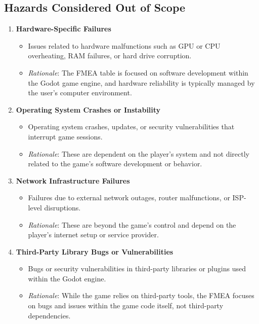\documentclass{article}
\begin{document}
\subsection{Hazards Considered Out of Scope}
\begin{enumerate}
    \item \textbf{Hardware-Specific Failures}
        \begin{itemize}
            \item Issues related to hardware malfunctions such as GPU or CPU overheating, RAM failures, or hard drive corruption.
            \item \textit{Rationale}: The FMEA table is focused on software development within the Godot game engine, and hardware reliability is typically managed by the user’s computer environment.
        \end{itemize}

    \item \textbf{Operating System Crashes or Instability}
        \begin{itemize}
            \item Operating system crashes, updates, or security vulnerabilities that interrupt game sessions.
            \item \textit{Rationale}: These are dependent on the player's system and not directly related to the game's software development or behavior.
        \end{itemize}

    \item \textbf{Network Infrastructure Failures}
        \begin{itemize}
            \item Failures due to external network outages, router malfunctions, or ISP-level disruptions.
            \item \textit{Rationale}: These are beyond the game's control and depend on the player's internet setup or service provider.
        \end{itemize}

    \item \textbf{Third-Party Library Bugs or Vulnerabilities}
        \begin{itemize}
            \item Bugs or security vulnerabilities in third-party libraries or plugins used within the Godot engine.
            \item \textit{Rationale}: While the game relies on third-party tools, the FMEA focuses on bugs and issues within the game code itself, not third-party dependencies.
        \end{itemize}


\end{enumerate}
\end{document}
